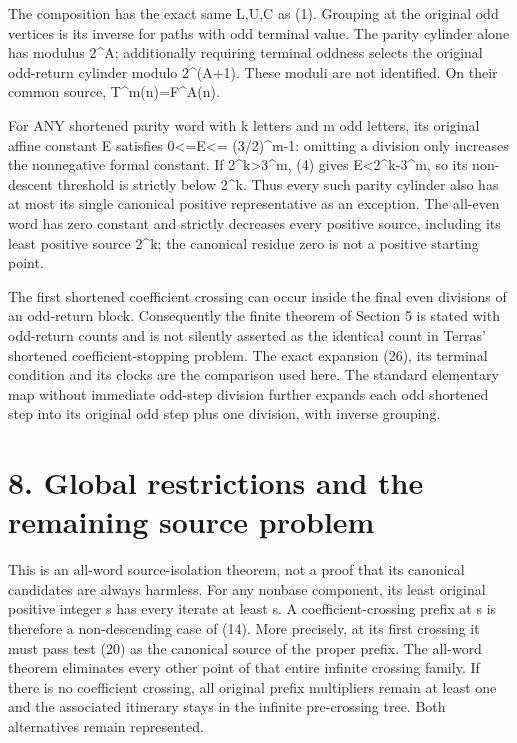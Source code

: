 The composition has the exact same L,U,C as (1). Grouping at the
original odd vertices is its inverse for paths with odd terminal value.
The parity cylinder alone has modulus 2\^{}A; additionally requiring
terminal oddness selects the original odd-return cylinder modulo
2\^{}(A+1). These moduli are not identified. On their common source,
T\^{}m(n)=F\^{}A(n).

For ANY shortened parity word with k letters and m odd letters, its
original affine constant E satisfies 0\textless=E\textless=
(3/2)\^{}m-1: omitting a division only increases the nonnegative formal
constant. If 2\^{}k\textgreater3\^{}m, (4) gives
E\textless2\^{}k-3\^{}m, so its non-descent threshold is strictly below
2\^{}k. Thus every such parity cylinder also has at most its single
canonical positive representative as an exception. The all-even word has
zero constant and strictly decreases every positive source, including
its least positive source 2\^{}k; the canonical residue zero is not a
positive starting point.

The first shortened coefficient crossing can occur inside the final even
divisions of an odd-return block. Consequently the finite theorem of
Section 5 is stated with odd-return counts and is not silently asserted
as the identical count in Terras' shortened coefficient-stopping
problem. The exact expansion (26), its terminal condition and its clocks
are the comparison used here. The standard elementary map without
immediate odd-step division further expands each odd shortened step into
its original odd step plus one division, with inverse grouping.

\section{8. Global restrictions and the remaining source problem}

This is an all-word source-isolation theorem, not a proof that its
canonical candidates are always harmless. For any nonbase component, its
least original positive integer s has every iterate at least s. A
coefficient-crossing prefix at s is therefore a non-descending case of
(14). More precisely, at its first crossing it must pass test (20) as
the canonical source of the proper prefix. The all-word theorem
eliminates every other point of that entire infinite crossing family. If
there is no coefficient crossing, all original prefix multipliers remain
at least one and the associated itinerary stays in the infinite
pre-crossing tree. Both alternatives remain represented.

